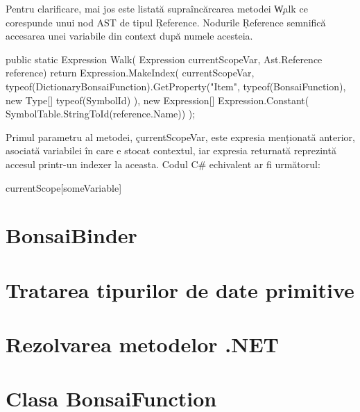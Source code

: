 \documentclass[12pt,a4paper]{memoir}
\begin{document}
Pentru clarificare, mai jos este listată supraîncărcarea metodei \c{Walk} ce corespunde unui nod AST de tipul \c{Reference}. Nodurile \c{Reference} semnifică accesarea unei variabile din context după numele acesteia. 
\begin{code}
public static Expression Walk(
    Expression currentScopeVar,
    Ast.Reference reference)
{
    return Expression.MakeIndex(
        currentScopeVar,
        typeof(DictionaryBonsaiFunction).GetProperty("Item", 
            typeof(BonsaiFunction), new Type[] { typeof(SymbolId) }), 
        new Expression[] { Expression.Constant(
            SymbolTable.StringToId(reference.Name)) });
}
\end{code}
Primul parametru al metodei, \c{currentScopeVar}, este expresia menționată anterior, asociată variabilei în care e stocat contextul, iar expresia returnată reprezintă accesul printr-un indexer la aceasta. Codul C\# echivalent ar fi următorul:
\begin{code}
currentScope[someVariable]
\end{code}

\section{BonsaiBinder}


\section{Tratarea tipurilor de date primitive}


\section{Rezolvarea metodelor .NET}


\section{Clasa BonsaiFunction}


\end{document}
